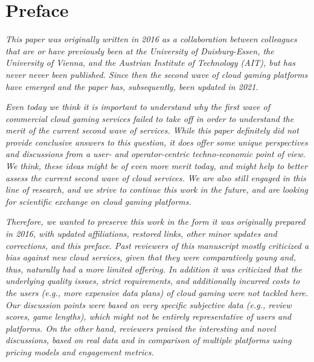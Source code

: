 \section*{Preface}


\textit{This paper was originally written in 2016 as a collaboration between colleagues that are or have previously been at the University of Duisburg-Essen, the University of Vienna, and the Austrian Institute of Technology (AIT), but has never never been published. Since then the second wave of cloud gaming platforms have emerged and the paper has, subsequently, been updated in 2021.}

\textit{Even today we think it is important to understand why the first wave of commercial cloud gaming services failed to take off in order to understand the merit of the current second wave of services. 
While this paper definitely did not provide conclusive answers to this question, it does offer some unique perspectives and discussions from a user- and operator-centric techno-economic point of view.
We think, these ideas might be of even more merit today, and might help to better assess the current second wave of cloud services. We are also still engaged in this line of research, and we strive to continue this work in the future, and are looking for scientific exchange on cloud gaming platforms.} 

\textit{
Therefore, we wanted to preserve this work in the form it was originally prepared in 2016, with updated affiliations, restored links, other minor updates and corrections, and this preface. Past reviewers of this manuscript mostly criticized a bias against new cloud services, given that they were comparatively young and, thus, naturally had a more limited offering. In addition it was criticized that the underlying quality issues, strict requirements, and additionally incurred costs to the users (e.g., more expensive data plans) of cloud gaming were not tackled here. Our discussion points were based on very specific subjective data (e.g., review scores, game lengths), which might not be entirely representative of users and platforms.
On the other hand, reviewers praised the interesting and novel discussions, based on real data and in comparison of multiple platforms using pricing models and engagement metrics.}
